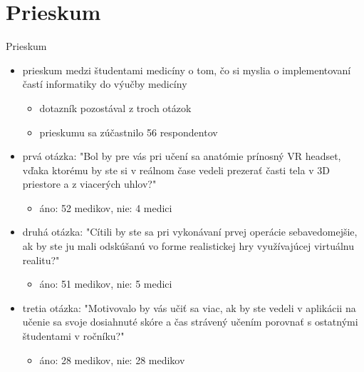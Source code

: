 \documentclass[10pt]{beamer}
\begin{document}
\section{Prieskum}\label{prieskum}
    \begin{frame}{Prieskum}
  \begin{itemize}
  \setlength\itemsep{1.3em}
\item prieskum medzi študentami medicíny o tom, čo si myslia o implementovaní častí informatiky do výučby medicíny
	\begin{itemize}
	\item dotazník pozostával z troch otázok
	\item prieskumu sa zúčastnilo 56 respondentov
	\end{itemize}
	
\item prvá otázka: "Bol by pre vás pri učení sa anatómie prínosný VR headset, vďaka ktorému by ste si v reálnom čase vedeli prezerať časti tela v 3D priestore a z viacerých uhlov?"
	\begin{itemize}
	\item áno: 52 medikov, nie: 4 medici
	\end{itemize}
	
\item druhá otázka: "Cítili by ste sa pri vykonávaní prvej operácie sebavedomejšie, ak by ste ju mali odskúšanú vo forme realistickej hry využívajúcej virtuálnu realitu?"
	\begin{itemize}
	\item áno: 51 medikov, nie: 5 medici
	\end{itemize}
	
\item tretia otázka: "Motivovalo by vás učiť sa viac, ak by ste vedeli v aplikácii na učenie sa svoje dosiahnuté skóre a čas strávený učením porovnať s ostatnými študentami v ročníku?"
	\begin{itemize}
	\item áno: 28 medikov, nie: 28 medikov
	\end{itemize}
	
\end{itemize}
\end{frame}
\end{document}
